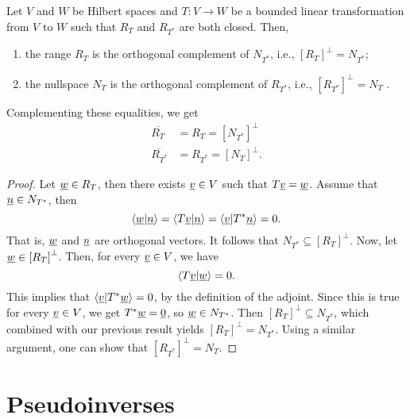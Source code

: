 \begin{theorem}
Let $V$ and $W$ be Hilbert spaces and $T \colon V \rightarrow W$ be a bounded linear transformation from $V$ to $W$ such that $R_T$ and $R_{T^*}$ are both closed.
Then,
\begin{enumerate}
\item the range $R_T$ is the orthogonal complement of $N_{T^*}$, i.e., $\left[ R_T \right]^{\bot} = N_{T^*}$;
\item the nullspace $N_T$ is the orthogonal complement of $R_{T^*}$, i.e., $\left[ R_{T^*} \right]^{\bot} = N_T$ .
\end{enumerate}
Complementing these equalities, we get
\begin{align*}
\overline{R_T} &= R_T = \left[ N_{T^*} \right]^{\bot} \\
\overline{R_{T^*}} &= R_{T^*} = \left[ N_T \right]^{\bot} .
\end{align*}
\end{theorem}
\begin{proof}
Let $\underline{w} \in R_T$, then there exists $\underline{v} \in V$ such that $T \underline{v} = \underline{w}$.
Assume that $\underline{n} \in N_{T^*}$, then
\begin{equation*}
\left\langle \underline{w} | \underline{n} \right\rangle
= \left\langle T \underline{v} | \underline{n} \right\rangle
= \left\langle \underline{v} | T^* \underline{n} \right\rangle
= 0 .
\end{equation*}
That is, $\underline{w}$ and $\underline{n}$ are orthogonal vectors.
It follows that $N_{T^*} \subseteq \left[ R_T \right]^{\bot}$.
Now, let $\underline{w} \in \left[ R_T \right]^{\bot}$.
Then, for every $\underline{v} \in V$, we have
\begin{equation*}
\left\langle T \underline{v} | \underline{w} \right\rangle = 0.
\end{equation*}
This implies that $\left\langle \underline{v} | T^* \underline{w} \right\rangle = 0$, by the definition of the adjoint.
Since this is true for every $\underline{v} \in V$, we get $T^* \underline{w} = \underline{0}$, so $\underline{w} \in N_{T^*}$.
Then $\left[ R_T \right]^{\bot} \subseteq N_{T^*}$, which combined with our previous result yields $\left[ R_T \right]^{\bot} = N_{T^*}$.
Using a similar argument, one can show that $\left[ R_{T^*} \right]^{\bot} = N_T$.
\end{proof}


\section{Pseudoinverses}

